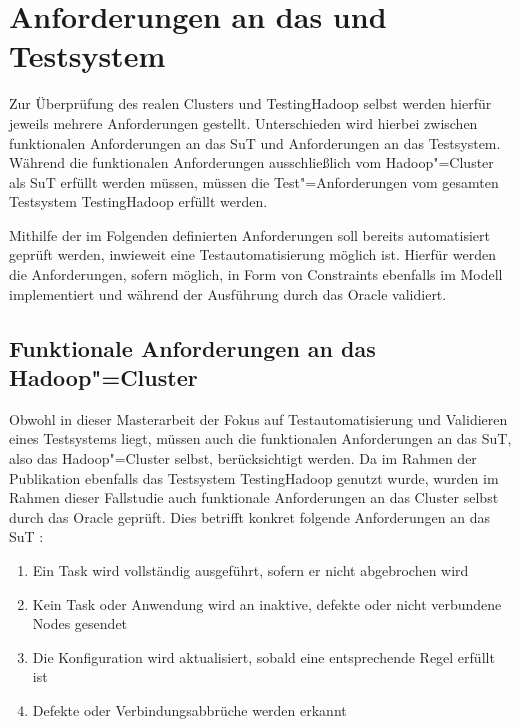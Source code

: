 \section{Anforderungen an das  und Testsystem}
\label{sec:requirements}

Zur Überprüfung des realen Clusters und TestingHadoop selbst werden hierfür jeweils mehrere Anforderungen gestellt.
Unterschieden wird hierbei zwischen funktionalen Anforderungen an das \gls{SuT} und Anforderungen an das Testsystem.
Während die funktionalen Anforderungen ausschließlich vom Hadoop"=Cluster als \gls{SuT} erfüllt werden müssen, müssen die Test"=Anforderungen vom gesamten Testsystem TestingHadoop erfüllt werden.

Mithilfe der im Folgenden definierten Anforderungen soll bereits automatisiert geprüft werden, inwieweit eine Testautomatisierung möglich ist.
Hierfür werden die Anforderungen, sofern möglich, in Form von Constraints ebenfalls im Modell implementiert und während der Ausführung durch das Oracle validiert.

\subsection{Funktionale Anforderungen an das Hadoop"=Cluster}
\label{subsec:functionalRequirements}

Obwohl in dieser Masterarbeit der Fokus auf Testautomatisierung und Validieren eines Testsystems liegt, müssen auch die funktionalen Anforderungen an das \gls{SuT}, also das Hadoop"=Cluster selbst, berücksichtigt werden.
Da im Rahmen der Publikation \cite{Eberhardinger2018} ebenfalls das Testsystem TestingHadoop genutzt wurde, wurden im Rahmen dieser Fallstudie auch funktionale Anforderungen an das Cluster selbst durch das Oracle geprüft.
Dies betrifft konkret folgende Anforderungen an das \gls{SuT} \cite{Eberhardinger2018}:

\begin{enumerate}
    \item Ein Task wird vollständig ausgeführt, sofern er nicht abgebrochen wird
    \item Kein Task oder Anwendung wird an inaktive, defekte oder nicht verbundene Nodes gesendet
    \item Die Konfiguration wird aktualisiert, sobald eine entsprechende Regel erfüllt ist
    \item Defekte oder Verbindungsabbrüche werden erkannt
\end{enumerate}

